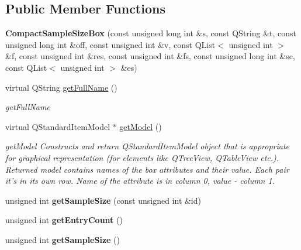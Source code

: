 \subsection*{Public Member Functions}
\begin{DoxyCompactItemize}
\item 
\hypertarget{class_compact_sample_size_box_ab61795847ac111bb3b5f9150318ad8ad}{{\bfseries Compact\-Sample\-Size\-Box} (const unsigned long int \&s, const Q\-String \&t, const unsigned long int \&off, const unsigned int \&v, const Q\-List$<$ unsigned int $>$ \&f, const unsigned int \&res, const unsigned int \&fs, const unsigned long int \&sc, const Q\-List$<$ unsigned int $>$ \&es)}\label{class_compact_sample_size_box_ab61795847ac111bb3b5f9150318ad8ad}

\item 
virtual Q\-String \hyperlink{class_compact_sample_size_box_a10c8ab4b452dd5c2d58e2c744ffac884}{get\-Full\-Name} ()
\begin{DoxyCompactList}\small\item\em get\-Full\-Name \end{DoxyCompactList}\item 
virtual Q\-Standard\-Item\-Model $\ast$ \hyperlink{class_compact_sample_size_box_a5bb876b4592c6ec6c2065ee3fbdaa869}{get\-Model} ()
\begin{DoxyCompactList}\small\item\em get\-Model Constructs and return Q\-Standard\-Item\-Model object that is appropriate for graphical representation (for elements like Q\-Tree\-View, Q\-Table\-View etc.). Returned model contains names of the box attributes and their value. Each pair it's in its own row. Name of the attribute is in column 0, value -\/ column 1. \end{DoxyCompactList}\item 
\hypertarget{class_compact_sample_size_box_a972f5b59a09a3691a0630d6aad2cec0a}{unsigned int {\bfseries get\-Sample\-Size} (const unsigned int \&id)}\label{class_compact_sample_size_box_a972f5b59a09a3691a0630d6aad2cec0a}

\item 
\hypertarget{class_compact_sample_size_box_a5c5027a65d1b1fff8837bf5ebb3b8293}{unsigned int {\bfseries get\-Entry\-Count} ()}\label{class_compact_sample_size_box_a5c5027a65d1b1fff8837bf5ebb3b8293}

\item 
\hypertarget{class_compact_sample_size_box_abb758372ce0db4d4b963845be990a864}{unsigned int {\bfseries get\-Sample\-Size} ()}\label{class_compact_sample_size_box_abb758372ce0db4d4b963845be990a864}

\end{DoxyCompactItemize}

